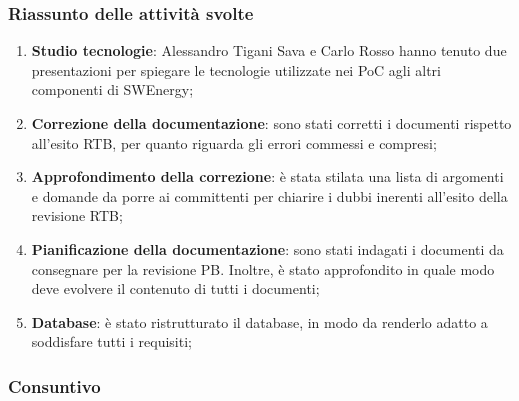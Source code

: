 \subsubsection{Riassunto delle attività svolte}
\begin{enumerate}
	\item \textbf{Studio tecnologie}: Alessandro Tigani Sava e Carlo Rosso hanno
	      tenuto due presentazioni per spiegare le tecnologie utilizzate nei PoC
	      agli altri componenti di SWEnergy;

	\item \textbf{Correzione della documentazione}: sono stati corretti i
	      documenti rispetto all'esito RTB, per quanto riguarda gli errori
	      commessi e compresi;

	\item \textbf{Approfondimento della correzione}: è stata stilata una lista
	      di argomenti e domande da porre ai committenti per chiarire i dubbi
	      inerenti all'esito della revisione RTB;

	\item \textbf{Pianificazione della documentazione}: sono stati indagati i
	      documenti da consegnare per la revisione PB. Inoltre, è stato
	      approfondito in quale modo deve evolvere il contenuto di tutti i
	      documenti;

	\item \textbf{Database}: è stato ristrutturato il database, in modo da
	      renderlo adatto a soddisfare tutti i requisiti;
\end{enumerate}

\subsubsection{Consuntivo}

